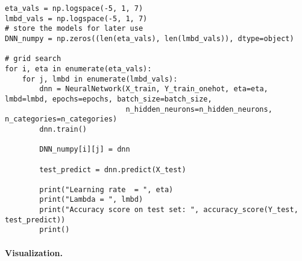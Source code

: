 \begin{verbatim}
eta_vals = np.logspace(-5, 1, 7)
lmbd_vals = np.logspace(-5, 1, 7)
# store the models for later use
DNN_numpy = np.zeros((len(eta_vals), len(lmbd_vals)), dtype=object)

# grid search
for i, eta in enumerate(eta_vals):
    for j, lmbd in enumerate(lmbd_vals):
        dnn = NeuralNetwork(X_train, Y_train_onehot, eta=eta, lmbd=lmbd, epochs=epochs, batch_size=batch_size,
                            n_hidden_neurons=n_hidden_neurons, n_categories=n_categories)
        dnn.train()
        
        DNN_numpy[i][j] = dnn
        
        test_predict = dnn.predict(X_test)
        
        print("Learning rate  = ", eta)
        print("Lambda = ", lmbd)
        print("Accuracy score on test set: ", accuracy_score(Y_test, test_predict))
        print()

\end{verbatim}


\paragraph{Visualization.}


































